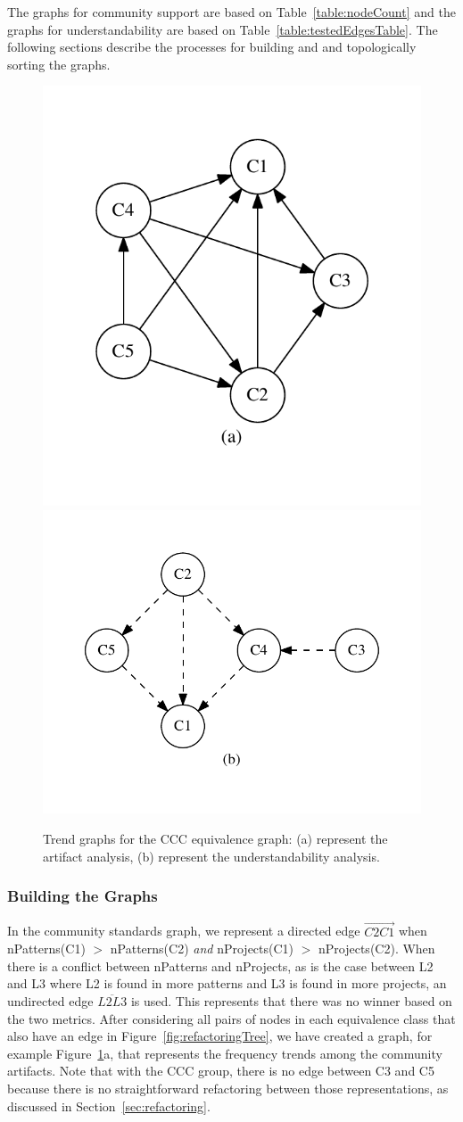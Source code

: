 The graphs for community support are based on Table~\ref{table:nodeCount} and the graphs for understandability are based on Table~\ref{table:testedEdgesTable}. The following sections describe the processes for building and and topologically sorting the graphs.

\begin{figure}[tb]
\centering
\includegraphics[width=0.42\columnwidth]{nontex/graphs/cart.pdf}\includegraphics[width=0.57\columnwidth]{nontex/graphs/ccom.pdf}
\vspace{-12pt}
\caption{Trend graphs for the CCC equivalence graph: (a) represent the artifact analysis, (b) represent the understandability analysis.}

\label{fig:graphsforanalysis}
\end{figure}


\subsubsection{Building the Graphs}
In the community standards graph, we represent a directed edge  $\overrightarrow{C2  C1}$ when  nPatterns(C1) $>$ nPatterns(C2) \emph{and}  nProjects(C1) $>$ nProjects(C2).
When there is a conflict between nPatterns and nProjects, as is the case between L2 and L3 where L2 is found in more patterns and L3 is found in more projects, an undirected edge $\overline{L2L3}$ is used.
This represents that there was no winner based on the two metrics.
After considering all pairs of nodes in each equivalence class that also have an edge in Figure~\ref{fig:refactoringTree}, we have created a graph, for example Figure~\ref{fig:graphsforanalysis}a, that represents the frequency trends among the community artifacts.
Note that with the CCC group, there is no edge between C3 and C5 because there is no straightforward refactoring between those representations, as discussed in Section~\ref{sec:refactoring}.

